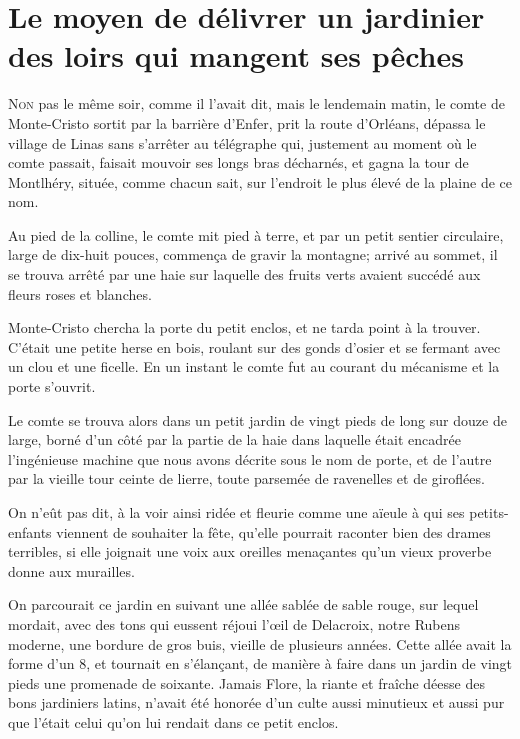 \chapter{Le moyen de délivrer un jardinier des loirs qui mangent ses pêches}

\lettrine{N}{on} pas le même soir, comme il l'avait dit, mais le lendemain matin, le comte de Monte-Cristo sortit par la barrière d'Enfer, prit la route d'Orléans, dépassa le village de Linas sans s'arrêter au télégraphe qui, justement au moment où le comte passait, faisait mouvoir ses longs bras décharnés, et gagna la tour de Montlhéry, située, comme chacun sait, sur l'endroit le plus élevé de la plaine de ce nom. 

Au pied de la colline, le comte mit pied à terre, et par un petit sentier circulaire, large de dix-huit pouces, commença de gravir la montagne; arrivé au sommet, il se trouva arrêté par une haie sur laquelle des fruits verts avaient succédé aux fleurs roses et blanches. 

Monte-Cristo chercha la porte du petit enclos, et ne tarda point à la trouver. C'était une petite herse en bois, roulant sur des gonds d'osier et se fermant avec un clou et une ficelle. En un instant le comte fut au courant du mécanisme et la porte s'ouvrit. 

Le comte se trouva alors dans un petit jardin de vingt pieds de long sur douze de large, borné d'un côté par la partie de la haie dans laquelle était encadrée l'ingénieuse machine que nous avons décrite sous le nom de porte, et de l'autre par la vieille tour ceinte de lierre, toute parsemée de ravenelles et de giroflées. 

On n'eût pas dit, à la voir ainsi ridée et fleurie comme une aïeule à qui ses petits-enfants viennent de souhaiter la fête, qu'elle pourrait raconter bien des drames terribles, si elle joignait une voix aux oreilles menaçantes qu'un vieux proverbe donne aux murailles. 

On parcourait ce jardin en suivant une allée sablée de sable rouge, sur lequel mordait, avec des tons qui eussent réjoui l'œil de Delacroix, notre Rubens moderne, une bordure de gros buis, vieille de plusieurs années. Cette allée avait la forme d'un 8, et tournait en s'élançant, de manière à faire dans un jardin de vingt pieds une promenade de soixante. Jamais Flore, la riante et fraîche déesse des bons jardiniers latins, n'avait été honorée d'un culte aussi minutieux et aussi pur que l'était celui qu'on lui rendait dans ce petit enclos. 

